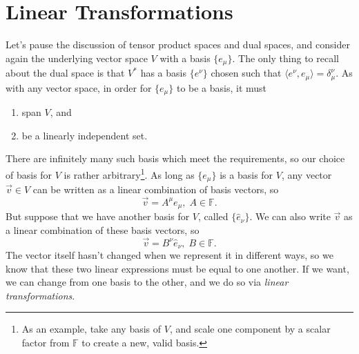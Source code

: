 \chapter{Linear Transformations}
Let's pause the discussion of tensor product spaces and dual spaces, and consider again the underlying vector space $V$ with a basis $\{e_\mu\}$.
The only thing to recall about the dual space is that $V^*$ has a basis $\{e^\nu\}$ chosen such that $\langle e^\nu, e_\mu \rangle = \delta^\nu_\mu$.
As with any vector space, in order for $\{e_\mu\}$ to be a basis, it must
\begin{enumerate}
    \item span $V$, and
    \item be a linearly independent set.
\end{enumerate}
There are infinitely many such basis which meet the requirements, so our choice of basis for $V$ is rather arbitrary\footnote{As an example, take any basis of $V$, and scale one component by a scalar factor from $\mathbb{F}$ to create a new, valid basis.}.
As long as $\{e_\mu\}$ is a basis for $V$, any vector $\vec{v} \in V$ can be written as a linear combination of basis vectors, so
\[ \vec{v} = A^\mu e_\mu,\;A \in \mathbb{F}. \]
But suppose that we have another basis for $V$, called $\{\hat{e}_\nu\}$.
We can also write $\vec{v}$ as a linear combination of these basis vectors,
so
\[ \vec{v} = B^\nu \hat{e}_\nu,\;B \in \mathbb{F}. \]
The vector itself hasn't changed when we represent it in different ways, so we know that these two linear expressions must be equal to one another.
If we want, we can change from one basis to the other, and we do so via \emph{linear transformations}.

